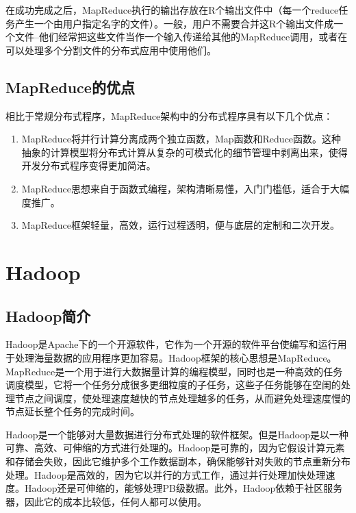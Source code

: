 在成功完成之后，MapReduce执行的输出存放在R个输出文件中（每一个reduce任务产生一个由用户指定名字的文件）。一般，用户不需要合并这R个输出文件成一个文件--他们经常把这些文件当作一个输入传递给其他的MapReduce调用，或者在可以处理多个分割文件的分布式应用中使用他们。

\subsection{MapReduce的优点}
相比于常规分布式程序，MapReduce架构中的分布式程序具有以下几个优点：
\begin{enumerate}

\item MapReduce将并行计算分离成两个独立函数，Map函数和Reduce函数。这种抽象的计算模型将分布式计算从复杂的可模式化的细节管理中剥离出来，使得开发分布式程序变得更加简洁。

\item MapReduce思想来自于函数式编程，架构清晰易懂，入门门槛低，适合于大幅度推广。

\item MapReduce框架轻量，高效，运行过程透明，便与底层的定制和二次开发。

\end{enumerate}


\section{Hadoop}

\subsection[Hadoop简介]{Hadoop简介\cite{book:Hadoop}}
Hadoop是Apache下的一个开源软件，它作为一个开源的软件平台使编写和运行用于处理海量数据的应用程序更加容易。Hadoop框架的核心思想是MapReduce。MapReduce是一个用于进行大数据量计算的编程模型，同时也是一种高效的任务调度模型，它将一个任务分成很多更细粒度的子任务，这些子任务能够在空闺的处理节点之间调度，使处理速度越快的节点处理越多的任务，从而避免处理速度慢的节点延长整个任务的完成时间。

Hadoop是一个能够对大量数据进行分布式处理的软件框架。但是Hadoop是以一种可靠、高效、可伸缩的方式进行处理的。Hadoop是可靠的，因为它假设计算元素和存储会失败，因此它维护多个工作数据副本，确保能够针对失败的节点重新分布处理。Hadoop是高效的，因为它以并行的方式工作，通过并行处理加快处理速度。Hadoop还是可伸缩的，能够处理PB级数据。此外，Hadoop依赖于社区服务器，因此它的成本比较低，任何人都可以使用。

